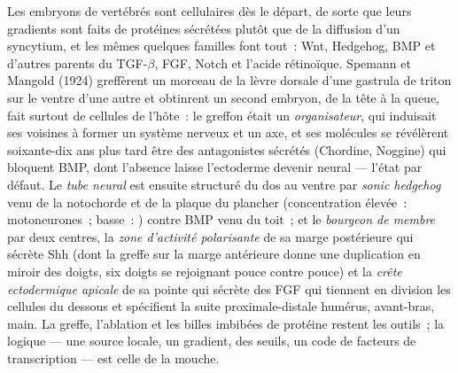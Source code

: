 \begin{definition}\label{def:b3:developmental-genetics:organiser}
Les embryons de vertébrés sont cellulaires dès le départ, de sorte que
leurs gradients sont faits de protéines sécrétées plutôt que de la
diffusion d'un syncytium, et les mêmes quelques familles font tout~:
Wnt, Hedgehog, BMP et d'autres parents du TGF-$\beta$, FGF, Notch et
l'acide rétinoïque. Spemann et Mangold (1924) greffèrent un morceau de
la lèvre dorsale d'une gastrula de triton sur le ventre d'une autre et
obtinrent un second embryon, de la tête à la queue, fait surtout de
cellules de l'hôte~: le greffon était un \emph{organisateur}, qui
induisait ses voisines à former un système nerveux et un axe, et ses
molécules se révélèrent soixante-dix ans plus tard être des antagonistes
sécrétés (Chordine, Noggine) qui bloquent BMP, dont l'absence laisse
l'ectoderme devenir neural --- l'état par défaut. Le \emph{tube neural}
est ensuite structuré du dos au ventre par \emph{sonic hedgehog} venu de
la notochorde et de la plaque du plancher (concentration élevée~:
motoneurones~; basse~: ) contre BMP venu du toit~; et le
\emph{bourgeon de membre} par deux centres, la \emph{zone d'activité
polarisante} de sa marge postérieure qui sécrète Shh (dont la greffe sur
la marge antérieure donne une duplication en miroir des doigts, six
doigts se rejoignant pouce contre pouce) et la \emph{crête ectodermique
apicale} de sa pointe qui sécrète des FGF qui tiennent en division les
cellules du dessous et spécifient la suite proximale-distale humérus,
avant-bras, main. La greffe, l'ablation et les billes imbibées de
protéine restent les outils~; la logique --- une source locale, un
gradient, des seuils, un code de facteurs de transcription --- est celle
de la mouche.
\end{definition}

